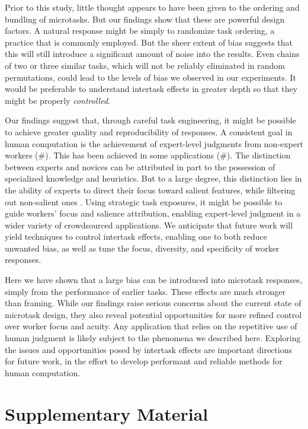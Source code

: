 \documentclass[12pt]{article}
\begin{document}
Prior to this study, little thought appears to have been given to the 
ordering and bundling of microtasks.  But our findings show that these are 
powerful design factors.  A natural response might be simply to randomize 
task ordering, a practice that is commonly employed.  But the sheer extent of 
bias suggests that this will still introduce a significant amount of noise
into the results.  Even chains of two or three similar tasks, which
will not be reliably eliminated in random permutations, could lead
to the levels of bias we observed in our experiments.
It would be preferable to understand intertask
effects in greater depth so that they might be properly \textit{controlled}.

Our findings suggest that, through careful task engineering,
it might be possible to achieve greater quality and reproducibility
of responses.  
A consistent goal in human computation is the achievement of expert-level
judgments from non-expert workers (\#).  This has been achieved in some
applications (\#). The distinction between experts and novices can be 
attributed in part to the possession of specialized knowledge and heuristics. 
But to a large degree, this distinction lies in the ability of 
experts to direct their focus toward salient features, while filtering out 
non-salient ones \cite{kellman2009perceptual}.  Using strategic task 
exposures, it might be possible to guide workers' focus and salience 
attribution, enabling expert-level judgment in a wider variety of 
crowdsourced applications.
We anticipate that future work will yield techniques to control intertask 
effects, enabling one to both reduce unwanted bias, as well as tune the 
focus, diversity, and specificity of worker responses.

Here we have shown that a large bias can be introduced into microtask 
responses, simply from the performance of earlier tasks. 
These effects are much stronger than framing.  
While our findings raise serious concerns about the 
current state of microtask design, they also reveal potential opportunities 
for more 
refined control over worker focus and acuity.  Any application that relies
on the repetitive use of human judgment is likely subject to the phenomena
we described here.  Exploring the issues and opportunities posed by 
intertask effects are important directions for future work, 
in the effort to develop performant and reliable methods for human 
computation.




\section*{Supplementary Material}
\end{document}
